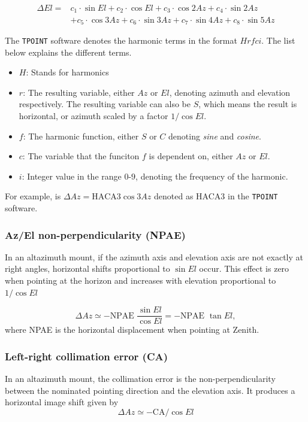 \begin{align}\label{eq:analytical_el}
    \Delta El =&  c_1 \cdot \sin{El} + c_2 \cdot \cos{El}+ c_3 \cdot \cos{2Az} + c_4 \cdot \sin{2Az} \\
    &+ c_5 \cdot \cos{3Az} + c_6 \cdot \sin{3Az} + c_7 \cdot \sin{4Az} + c_8 \cdot \sin{5Az}  
\end{align}


The \texttt{TPOINT} software denotes the harmonic terms in the format $Hrfci$. The list below explains the different terms.

\begin{itemize}
    \item $H$: Stands for harmonics
    \item $r$: The resulting variable, either $Az$ or $El$, denoting azimuth and elevation respectively.
    The resulting variable can also be $S$, which means the result is horizontal, or azimuth scaled by a factor $1/\cos{El}$.
    \item $f$: The harmonic function, either $S$ or $C$ denoting \textit{sine} and \textit{cosine}.
    \item $c$: The variable that the funciton $f$ is dependent on, either $Az$ or $El$.
    \item $i$: Integer value in the range $0$-$9$, denoting the frequency of the harmonic.
\end{itemize}

For example, is $\Delta Az = \text{HACA3}\cos{3Az}$ denoted as HACA3 in the \texttt{TPOINT} software.

\subsubsection{Az/El non-perpendicularity (NPAE)}
In an altazimuth mount, if the azimuth axis and elevation axis are not exactly at
right angles, horizontal shifts proportional to $\sin{El}$ occur. This effect is zero when pointing at the horizon and increases with elevation proportional to $1/\cos{El}$

\begin{equation}
    \Delta Az \simeq - \text{NPAE } \frac{\sin{El}}{\cos{El}}= - \text{NPAE } \tan{El},
\end{equation}
where NPAE is the horizontal displacement when pointing at Zenith.

\subsubsection{Left-right collimation error (CA)}
In an altazimuth mount, the collimation error is the non-perpendicularity between the nominated pointing direction and the elevation axis.
It produces a horizontal image shift given by
\begin{equation}\label{eq:pmodel_ca}
    \Delta Az \simeq -\text{CA} / \cos{El}
\end{equation}


